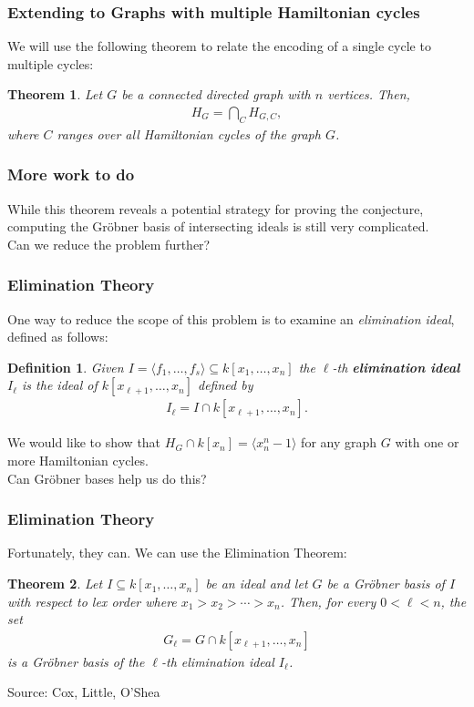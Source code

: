 \documentclass{beamer}
\newtheorem*{defin}{Definition}
\newtheorem*{thm}{Theorem}
\begin{document}
\begin{frame}
\frametitle{Extending to Graphs with multiple Hamiltonian cycles}
We will use the following theorem to relate the encoding of a single cycle to multiple cycles:
\begin{thm}
Let $G$ be a connected directed graph with $n$ vertices. Then,
\begin{align*}
	H_G = \bigcap_C H_{G,C},
\end{align*}
where $C$ ranges over all Hamiltonian cycles of the graph $G$.
\end{thm}
\end{frame}

\begin{frame}
\frametitle{More work to do}
While this theorem reveals a potential strategy for proving the conjecture, computing the Gr\"obner basis of intersecting ideals is still very complicated.\\
\vfill
Can we reduce the problem further?
\end{frame}

\begin{frame}
\frametitle{Elimination Theory}
One way to reduce the scope of this problem is to examine an \emph{elimination ideal}, defined as follows:
\begin{defin}
Given $I = \langle f_1, \ldots, f_s \rangle \subseteq k[x_1, \ldots, x_n]$ the $\ell$-th \textbf{elimination ideal} $I_\ell$ is the ideal of $k[x_{\ell+1}, \ldots, x_n]$ defined by
\begin{align*}
	I_\ell = I \cap k[x_{\ell+1}, \ldots, x_n].
\end{align*}
\end{defin}
We would like to show that $H_G \cap k[x_n] = \langle x_n^n - 1 \rangle$ for any graph $G$ with one or more Hamiltonian cycles.\\
Can Gr\"obner bases help us do this?
\end{frame}

\begin{frame}
\frametitle{Elimination Theory}
Fortunately, they can. We can use the Elimination Theorem:
\begin{thm}
Let $I \subseteq k[x_1, \ldots, x_n]$ be an ideal and let $G$ be a Gr\"obner basis of $I$ with respect to lex order where $x_1 > x_2 > \cdots > x_n$. Then, for every $0 < \ell < n$, the set
\begin{align*}
	G_\ell = G \cap k[x_{\ell+1}, \ldots, x_n]
\end{align*}
is a Gr\"obner basis of the $\ell$-th elimination ideal $I_\ell$.
\end{thm}
Source: Cox, Little, O'Shea
\end{frame}
\end{document}
